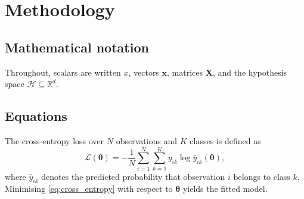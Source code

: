 \chapter{Methodology}
\label{sec:methodology}

\section{Mathematical notation}
\label{sec:notation}

%
%

Throughout, scalars are written $x$, vectors $\bm{x}$, matrices $\bm{X}$, and
the hypothesis space $\mathcal{H} \subseteq \mathbb{R}^{d}$.

\section{Equations}
\label{sec:equations}

%
%

The cross-entropy loss over $N$ observations and $K$ classes is defined as
\parencite{goodfellow2016deep}
\begin{equation}
  \mathcal{L}(\bm{\theta}) = -\frac{1}{N} \sum_{i=1}^{N} \sum_{k=1}^{K}
    y_{ik} \log \hat{y}_{ik}(\bm{\theta}),
  \label{eq:cross_entropy}
\end{equation}
where $\hat{y}_{ik}$ denotes the predicted probability that observation $i$
belongs to class $k$. Minimising \eqref{eq:cross_entropy} with respect to
$\bm{\theta}$ yields the fitted model.

